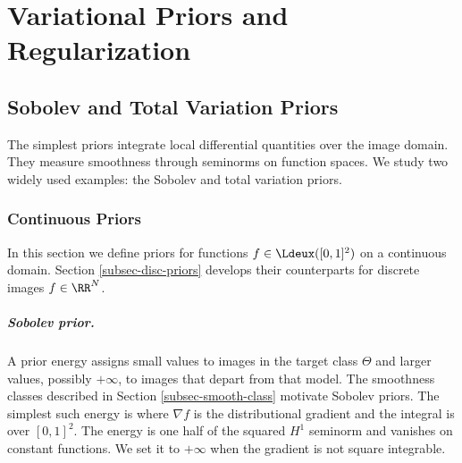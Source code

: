 
\chapter{Variational Priors and Regularization}
\label{chap-variational}

\section{Sobolev and Total Variation Priors}
\label{sec-sob-tv-variational}

The simplest priors integrate local differential quantities over the image domain. They measure smoothness through seminorms on function spaces. We study two widely used examples: the Sobolev and total variation priors.

\subsection{Continuous Priors}
\label{sec-sob-tv-cont}

In this section we define priors for functions $f \in \Ldeux([0,1]^2)$ on a continuous domain. Section \ref{subsec-disc-priors} develops their counterparts for discrete images $f \in \RR^N$.

\paragraph{Sobolev prior.}

A prior energy assigns small values to images in the target class $\Theta$ and larger values, possibly $+\infty$, to images that depart from that model. The smoothness classes described in Section \ref{subsec-smooth-class} motivate Sobolev priors. The simplest such energy is
where $\nabla f$ is the distributional gradient and the integral is over $[0,1]^2$. The energy is one half of the squared $H^1$ seminorm and vanishes on constant functions. We set it to $+\infty$ when the gradient is not square integrable.

